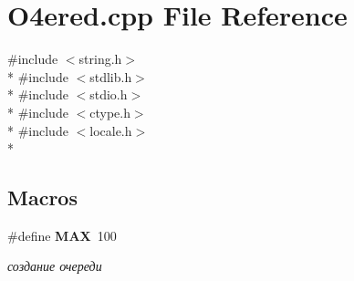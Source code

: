 \section{O4ered.\-cpp File Reference}
\label{_o4ered_8cpp}
{\ttfamily \#include $<$string.\-h$>$}\\*
{\ttfamily \#include $<$stdlib.\-h$>$}\\*
{\ttfamily \#include $<$stdio.\-h$>$}\\*
{\ttfamily \#include $<$ctype.\-h$>$}\\*
{\ttfamily \#include $<$locale.\-h$>$}\\*
\subsection*{Macros}
\begin{DoxyCompactItemize}
\item 
\#define {\bf M\-A\-X}~100
\begin{DoxyCompactList}\small\item\em создание очереди \end{DoxyCompactList}\end{DoxyCompactItemize}

